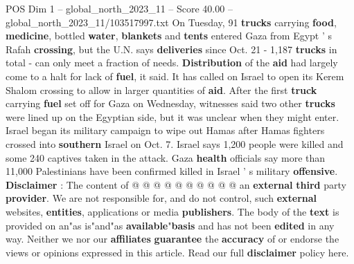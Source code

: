 \begin{textsample}{POS Dim 1 – global\_north\_2023\_11 – Score 40.00 – global\_north\_2023\_11/103517997.txt}
On Tuesday, 91 \textbf{trucks} carrying \textbf{food}, \textbf{medicine}, bottled \textbf{water}, \textbf{blankets} and \textbf{tents} entered Gaza from Egypt ' s Rafah \textbf{crossing}, but the U.N. says \textbf{deliveries} since Oct. 21 - 1,187 \textbf{trucks} in total - can only meet a fraction of needs. \textbf{Distribution} of the \textbf{aid} had largely come to a halt for lack of \textbf{fuel}, it said.
It has called on Israel to open its Kerem Shalom crossing to allow in larger quantities of \textbf{aid}.
After the first \textbf{truck} carrying \textbf{fuel} set off for Gaza on Wednesday, witnesses said two other \textbf{trucks} were lined up on the Egyptian side, but it was unclear when they might enter.
Israel began its military campaign to wipe out Hamas after Hamas fighters crossed into \textbf{southern} Israel on Oct. 7.
Israel says 1,200 people were killed and some 240 captives taken in the attack.
Gaza \textbf{health} officials say more than 11,000 Palestinians have been confirmed killed in Israel ' s military \textbf{offensive}. \textbf{Disclaimer} : The content of @ @ @ @ @ @ @ @ @ @ an \textbf{external} \textbf{third} party \textbf{provider}.
We are not responsible for, and do not control, such \textbf{external} websites, \textbf{entities}, applications or media \textbf{publishers}.
The body of the \textbf{text} is provided on an"as is"and"as \textbf{available}"\textbf{basis} and has not been \textbf{edited} in any way.
Neither we nor our \textbf{affiliates} \textbf{guarantee} the \textbf{accuracy} of or endorse the views or opinions expressed in this article.
Read our full \textbf{disclaimer} policy here.

\end{textsample}
